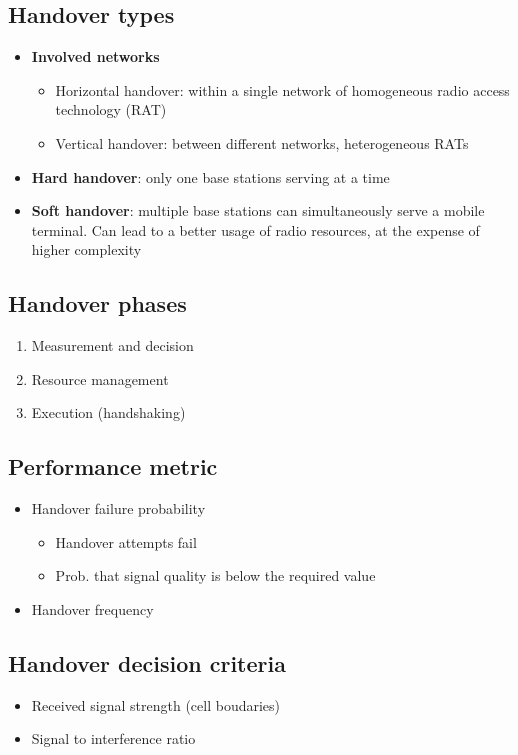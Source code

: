 \subsection{Handover types}
\begin{itemize}
	\item \textbf{Involved networks}
	\begin{itemize}
		\item Horizontal handover: within a single network of homogeneous radio access technology (RAT)
    	\item Vertical handover: between different networks, heterogeneous RATs
	\end{itemize}
	\item \textbf{Hard handover}: only one base stations serving at a time
	\item \textbf{Soft handover}: multiple base stations can simultaneously serve a mobile terminal. Can lead to a better usage of radio resources, at the expense of higher complexity
\end{itemize}
\subsection{Handover phases}
\begin{enumerate}
	\item Measurement and decision
	\item Resource management 
	\item Execution (handshaking)
\end{enumerate}
\subsection{Performance metric}
\begin{itemize}
	\item Handover failure probability
    \begin{itemize}
    	\item Handover attempts fail
    	\item Prob. that signal quality is below the required value
    \end{itemize}
	\item Handover frequency
\end{itemize}
\subsection{Handover decision criteria}
\begin{itemize}
	\item Received signal strength (cell boudaries)
	\item Signal to interference ratio
\end{itemize}

